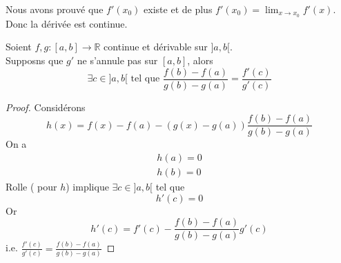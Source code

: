 \documentclass[../main.tex]{subfiles}
\begin{document}
\begin{rmq}
	Nous avons prouvé que $f'( x_0) $ existe et de plus $f'( x_0) = \lim_{x \to x_0} f'( x) $.\\
Donc la dérivée est continue.
\end{rmq}
\begin{thm}\label{thm:theoreme_de_cauchy}
	Soient $f,g : [ a,b] \to \mathbb{R}$ continue et dérivable sur $]a,b[$.\\	
	Supposns que $g'$ ne s'annule pas sur $[a,b]$, alors 
	\[ 
		\exists c \in ]a,b[ \text{ tel que } \frac{f( b) - f( a) }{g( b) - g( a) } = \frac{f'( c) }{g'( c) }
	\]
	
\end{thm}
\begin{proof}
Considérons
\[ 
	h( x)  = f( x) - f( a) - ( g(x ) - g( a)  ) \frac{f( b) - f( a) }{g( b) - g( a) }
\]
On a 
\begin{align*}
	h( a) = 0\\
	h( b) = 0
\end{align*}
Rolle ( pour $h$) implique $\exists c \in ]a,b[ $ tel que
\[ 
	h'( c) = 0
\]
Or  
\[ 
	h'( c)  = f'( c) - \frac{f( b) - f( a) }{g( b) - g( a) }g'( c) 
\]
i.e. $\frac{f'( c) }{g'( c) }= \frac{f( b) - f( a) }{g( b) - g( a) } $

\end{proof}
\end{document}

